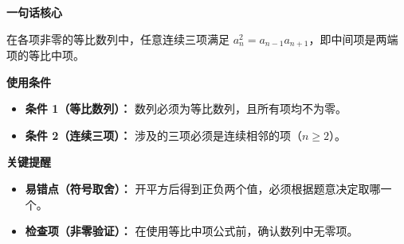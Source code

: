 \begin{summarybox}

	\textbf{\textcolor{CSummary}{一句话核心}}

	在各项非零的等比数列中，任意连续三项满足 $a_n^2 = a_{n-1}a_{n+1}$，即中间项是两端项的等比中项。

	\medskip
	\textbf{\textcolor{CSummary}{使用条件}}
	\begin{itemize}[leftmargin=*, itemsep=0.5em, topsep=0.4em]
		\item \textbf{条件 1（等比数列）：} 数列必须为等比数列，且所有项均不为零。
		\item \textbf{条件 2（连续三项）：} 涉及的三项必须是连续相邻的项（$n\ge 2$）。
	\end{itemize}

	\medskip
	\textbf{\textcolor{CSummary}{关键提醒}}
	\begin{itemize}[leftmargin=*, itemsep=0.5em, topsep=0.4em]
		\item \textbf{易错点（符号取舍）：} 开平方后得到正负两个值，必须根据题意决定取哪一个。
		\item \textbf{检查项（非零验证）：} 在使用等比中项公式前，确认数列中无零项。
	\end{itemize}
\end{summarybox}
